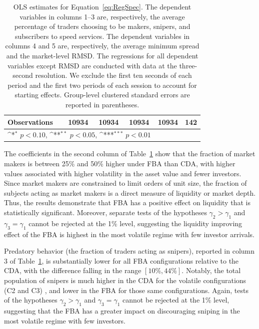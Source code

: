 \documentclass[12pt]{article}
\def\sym#1{\ifmmode^{#1}\else\(^{#1}\)\fi}
\begin{document}
\begin{table}
\begin{tabular}{l*{5}{c}}
\midrule
Observations        &       10934         &       10934         &       10934         &       10934         &         142         \\
\bottomrule
\multicolumn{4}{l}{\footnotesize \sym{*} \(p<0.10\), \sym{**} \(p<0.05\), \sym{***} \(p<0.01\)}\\
\end{tabular}
\caption{\label{tab:Regressions} {\small OLS estimates for Equation~\eqref{eq:RegSpec}. The dependent variables in columns 1--3 are, respectively, the average percentage of traders choosing to be makers,  snipers, and subscribers to speed services. The dependent variables in columns 4 and 5 are, respectively, the average minimum spread and the market-level RMSD. The regressions for all dependent variables except RMSD are conducted with data at the three-second resolution. We exclude the first ten seconds of each period and the first two periods of each session to account for starting effects. Group-level clustered standard errors are reported in parentheses.}}
\end{table}

The coefficients in the second column of Table~\ref{tab:Regressions} show that the fraction of market makers is between 25\% and 50\% higher under FBA than CDA, with higher values associated with higher volatility in the asset value and fewer investors. Since market makers are constrained to limit orders of unit size, the fraction of subjects acting as market makers is a direct measure of liquidity or market depth. Thus, the results demonstrate that FBA has a positive effect on liquidity that is statistically significant. Moreover, separate tests of the hypotheses $\gamma_2 > \gamma_1$ and  $\gamma_3=\gamma_1$ cannot be rejected at the 1\% level, suggesting the liquidity improving effect of the FBA is highest in the most volatile regime with few investor arrivals.

Predatory behavior (the fraction of traders acting as snipers), reported in column 3 of Table~\ref{tab:Regressions}, is substantially lower for all FBA configurations relative to the CDA, with the difference falling in the range $[10\%,44\%]$.
Notably, the total population of snipers is much higher in the CDA for the volatile configurations (C2 and C3) , and lower in the FBA for those same configurations.
Again, tests of the hypotheses $\gamma_2 > \gamma_1$ and  $\gamma_3=\gamma_1$ cannot be rejected at the 1\% level, suggesting that the FBA has a greater impact on discouraging sniping in the most volatile regime with few investors.
\end{document}
